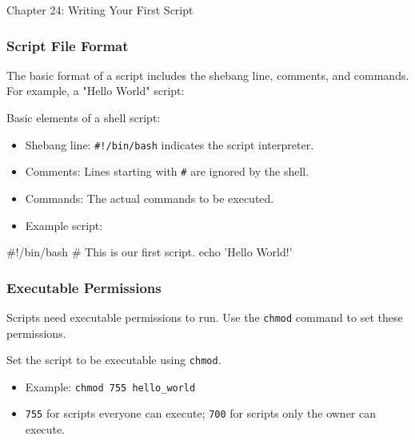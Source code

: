 \begin{notes}{Chapter 24: Writing Your First Script}
\begin{highlight}
    \end{highlight}
    
    \subsubsection*{Script File Format}
    
    The basic format of a script includes the shebang line, comments, and commands. For example, a "Hello World" script:
    
    \begin{highlight}
    
    Basic elements of a shell script:
    
    \begin{itemize}
        \item Shebang line: \texttt{\#!/bin/bash} indicates the script interpreter.
        \item Comments: Lines starting with \texttt{\#} are ignored by the shell.
        \item Commands: The actual commands to be executed.
        \item Example script:
    \end{itemize}
    
    \begin{code}[Shell]
    #!/bin/bash
    # This is our first script.
    echo 'Hello World!'
    \end{code}
    
    \end{highlight}
    
    \subsubsection*{Executable Permissions}
    
    Scripts need executable permissions to run. Use the \texttt{chmod} command to set these permissions.
    
    \begin{highlight}
    
    Set the script to be executable using \texttt{chmod}.
    
    \begin{itemize}
        \item Example: \texttt{chmod 755 hello\_world}
        \item \texttt{755} for scripts everyone can execute; \texttt{700} for scripts only the owner can execute.
    \end{itemize}
    

\end{highlight}
\end{notes}
